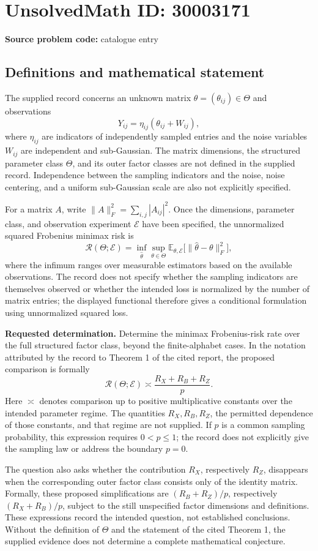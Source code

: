 \documentclass[11pt]{article}
\begin{document}
\section*{UnsolvedMath ID: 30003171}
\textbf{Source problem code:} catalogue entry
\subsection{Definitions and mathematical statement}
The supplied record concerns an unknown matrix \(\theta=(\theta_{ij})\in\Theta\) and observations
\[
Y_{ij}=\eta_{ij}(\theta_{ij}+W_{ij}),
\]
where \(\eta_{ij}\) are indicators of independently sampled entries and the noise variables \(W_{ij}\) are independent and sub-Gaussian. The matrix dimensions, the structured parameter class \(\Theta\), and its outer factor classes are not defined in the supplied record. Independence between the sampling indicators and the noise, noise centering, and a uniform sub-Gaussian scale are also not explicitly specified.

For a matrix \(A\), write \(\|A\|_F^2=\sum_{i,j}|A_{ij}|^2\). Once the dimensions, parameter class, and observation experiment \(\mathcal E\) have been specified, the unnormalized squared Frobenius minimax risk is
\[
\mathcal R(\Theta;\mathcal E)
=\inf_{\widehat\theta}\sup_{\theta\in\Theta}
\mathbb E_{\theta,\mathcal E}
\bigl[\|\widehat\theta-\theta\|_F^2\bigr],
\]
where the infimum ranges over measurable estimators based on the available observations. The record does not specify whether the sampling indicators are themselves observed or whether the intended loss is normalized by the number of matrix entries; the displayed functional therefore gives a conditional formulation using unnormalized squared loss.

\textbf{Requested determination.} Determine the minimax Frobenius-risk rate over the full structured factor class, beyond the finite-alphabet cases. In the notation attributed by the record to Theorem 1 of the cited report, the proposed comparison is formally
\[
\mathcal R(\Theta;\mathcal E)
\asymp \frac{R_X+R_B+R_Z}{p}.
\]
Here \(\asymp\) denotes comparison up to positive multiplicative constants over the intended parameter regime. The quantities \(R_X,R_B,R_Z\), the permitted dependence of those constants, and that regime are not supplied. If \(p\) is a common sampling probability, this expression requires \(0<p\leq1\); the record does not explicitly give the sampling law or address the boundary \(p=0\).

The question also asks whether the contribution \(R_X\), respectively \(R_Z\), disappears when the corresponding outer factor class consists only of the identity matrix. Formally, these proposed simplifications are \((R_B+R_Z)/p\), respectively \((R_X+R_B)/p\), subject to the still unspecified factor dimensions and definitions. These expressions record the intended question, not established conclusions. Without the definition of \(\Theta\) and the statement of the cited Theorem 1, the supplied evidence does not determine a complete mathematical conjecture.
\end{document}
